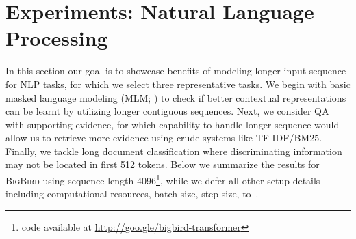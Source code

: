 \documentclass{article}
\newcommand{\bigb}{\textsc{BigBird}\xspace}
\begin{document}
\section{Experiments: Natural Language Processing} \label{sec:expt-nlp}

In this section our goal is to showcase benefits of modeling longer input sequence for NLP tasks, for which we select three representative tasks.
We begin with basic masked language modeling (MLM; \citealt{devlin2018bert}) to check if better contextual representations can be learnt by utilizing longer contiguous sequences.
Next, we consider QA with supporting evidence, for which capability to handle longer sequence would allow us to retrieve more evidence using crude systems like TF-IDF/BM25.
Finally, we tackle long document classification where discriminating information may not be located in first 512 tokens.
Below we summarize the results for \bigb using sequence length 4096\footnote{code available at \url{http://goo.gle/bigbird-transformer}}, while we defer all other setup details including computational resources, batch size, step size, to~. 
\end{document}
